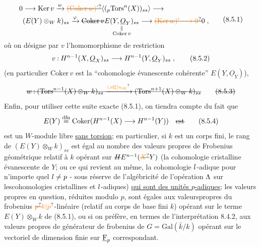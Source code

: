 \[
\begin{aligned}
0&\handwritten{\longrightarrow}\mathrm{Ker}\,v\xrightarrow{\handwritten{w}}\deleted{\unsure{(\mathrm{Coker}\,w)'}}\inserted{\handwritten{({}_p\mathrm{Tors}^{n}(X))_{ss}}}\handwritten{\longrightarrow}\\
&(E(Y)\otimes_W k)_{ss}\xrightarrow{\handwritten{\varphi}}
\deleted{\mathrm{Coker}\,v}\underset{\handwritten{\substack{\Vert\\\mathrm{Coker}\,v}}}{\handwritten{E(Y,\underline O_Y)_{ss}}}\handwritten{\longrightarrow}
\deleted{\unsure{(\mathrm{Ker}\,w)'\longrightarrow0}}\handwritten{0}\;,
\end{aligned}
\tag*{(8.5.1)}
\]
où on désigne par $v$ l'homomorphisme de restriction
\[
v\mathbin{:}H^{n-1}(X,\underline O_X)_{ss}\longrightarrow H^{n-1}(Y,\underline O_Y)_{ss}\;,
\tag*{(8.5.2)}
\]
(en particulier $\mathrm{Coker}\,v$ est la ``cohomologie évanescente cohérente'' $E(Y,\underline O_Y)$), 
\[
\deleted{w\mathbin{:}(\mathrm{Tors}^{n-1}(X)\otimes_W k)_{ss}\xrightarrow{\handwritten{\unsure{\cup d\xi|u_{d\xi}}}}(\mathrm{Tors}^{n+1}(X)\otimes_W k)_{ss}}
\tag*{\deleted{(8.5.3)}}
\]
 Enfin, pour utiliser cette suite exacte (8.5.1), on tiendra compte du fait que
\[
E(Y)\overset{\rm dfn}{=}\mathrm{Coker}(H^{n-1}(X)\handwritten{\longrightarrow}H^{n-1}(Y))\quad\deleted{\text{est}}
\tag*{(8.5.4)}
\]
est un $W$-module libre \uline{sans torsion}; en particulier, si $k$ est un corps fini, le rang de $(E(Y)\otimes_W k)_{ss}$ est égal au nombre des valeurs propres de Frobenius géométrique relatif à $k$ opérant sur $\deleted{H}E^{n-1}(\deleted{\unsure{X}}Y)$ (la cohomologie cristalline évanescente de $Y$; ou ce qui revient au même, la cohomologie $l$-adique pour n'importe quel $l\ne p$ - sous réserve de l'algébricité de l'opération $\Lambda$ sur lescohomologies cristallines et $l$-adiques) \uline{qui sont des unités $p$-adiques}; les valeurs propres en question, réduites modulo $p$, sont égales aux valeurs\handwritten{\,}propres du frobenius $\deleted{\unsure{p}}\unsure{k|p}$-linéaire (relatif au corps de base fini $k$) opérant sur le terme $E(Y)\otimes_W k$ de (8.5.1), ou si on préfère, en termes de l'interprétation 8.4.2, aux valeurs propres de  générateur de frobenius de $G=\mathrm{Gal}(\bar k/k)$ opérant sur le vectoriel de dimension finie sur $\underline{\rm F}_p$ correspondant.

